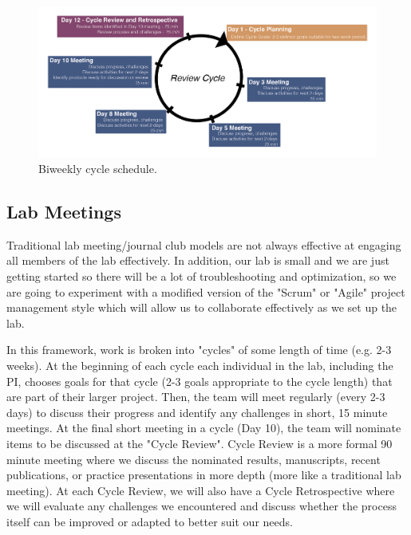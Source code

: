 \documentclass[10pt, a4paper, twocolumn]{article} %
\begin{document}
\begin{figure}
  \includegraphics[width=\textwidth]{Core_Competencies-02.png}
  \caption{Biweekly cycle schedule.}
\end{figure}
\subsection{Lab Meetings}
Traditional lab meeting/journal club models are not always effective at engaging all members of the lab effectively.  In addition, our lab is small and we are just getting started so there will be a lot of troubleshooting and optimization, so we are going to experiment with a modified version of the "Scrum" or "Agile" project management style which will allow us to collaborate effectively as we set up the lab.

In this framework, work is broken into "cycles" of some length of time (e.g. 2-3 weeks). At the beginning of each cycle each individual in the lab, including the PI, chooses goals for that cycle (2-3 goals appropriate to the cycle length) that are part of their larger project. Then, the team will meet regularly (every 2-3 days) to discuss their progress and identify any challenges in short, 15 minute meetings. At the final short meeting in a cycle (Day 10), the team will nominate items to be discussed at the "Cycle Review". Cycle Review is a more formal 90 minute meeting where we discuss the nominated results, manuscripts, recent publications, or practice presentations in more depth (more like a traditional lab meeting). At each Cycle Review, we will also have a Cycle Retrospective where we will evaluate any challenges we encountered and discuss whether the process itself can be improved or adapted to better suit our needs.
\end{document}
